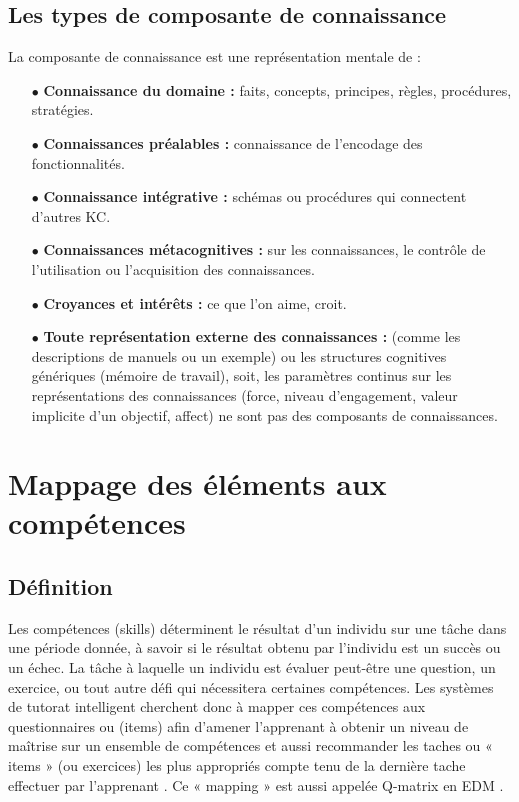 \subsection{Les types de composante de connaissance}

La composante de connaissance est une représentation mentale de : \cite{chang2006learning}

\begin{itemize}
    \item[$\bullet$] \textbf{Connaissance du domaine :} faits, concepts, principes, règles, procédures, stratégies.
    \item[$\bullet$] \textbf{Connaissances préalables :} connaissance de l'encodage des fonctionnalités.
    \item[$\bullet$] \textbf{Connaissance intégrative :} schémas ou procédures qui connectent d'autres KC.
    \item[$\bullet$] \textbf{Connaissances métacognitives :} sur les connaissances, le contrôle de l'utilisation ou l'acquisition des connaissances.
    \item[$\bullet$] \textbf{Croyances et intérêts :} ce que l'on aime, croit.
    \item[$\bullet$] \textbf{Toute représentation externe des connaissances :} (comme les descriptions de manuels ou un exemple) ou les structures cognitives génériques (mémoire de travail), soit, les paramètres continus sur les représentations des connaissances (force, niveau d'engagement, valeur implicite d'un objectif, affect) ne sont pas des composants de connaissances.
\end{itemize}

\section{Mappage des éléments aux compétences}  %
\subsection{Définition}
Les compétences (skills) déterminent le résultat d'un individu sur une tâche dans une période donnée, à savoir si le résultat obtenu par l'individu est un succès ou un échec. La tâche à laquelle un individu est évaluer peut-être une question, un exercice, ou tout autre défi qui nécessitera certaines compétences. Les systèmes de tutorat intelligent cherchent donc à mapper ces compétences aux questionnaires ou (items) afin d'amener l'apprenant à obtenir un niveau de maîtrise sur un ensemble de compétences et aussi recommander les taches ou « items » (ou exercices) les plus appropriés compte tenu de la dernière tache effectuer par l’apprenant \cite{desmarais2012mapping}. Ce « mapping » est aussi appelée Q-matrix en EDM \cite{baker2009state}.
